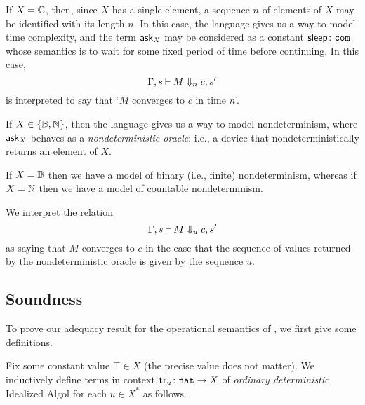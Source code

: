 \documentclass{article}
\begin{document}
\begin{example}
  If $X=\mathbb{C}$, then, since $X$ has a single element, a sequence $n$ of elements of $X$ may be identified with its length $n$.
  In this case, the language \IAX gives us a way to model time complexity, and the term $\operatorname{{\mathsf{ask}}}_X$ may be considered as a constant ${\mathsf{sleep}}\colon {\mathtt{com}}$ whose semantics is to wait for some fixed period of time before continuing.  
  In this case, 
  \[
    \Gamma,s\mathbin{\vdash} M \Downarrow_n c,s'
    \]
  is interpreted to say that `$M$ converges to $c$ in time $n$'.
\end{example}
\begin{example}
  If $X\in\{\mathbb{B},\mathbb{N}\}$, then the language \IAX gives us a way to model nondeterminism, where $\operatorname{{\mathsf{ask}}}_X$ behaves as a \emph{nondeterministic oracle}; i.e., a device that nondeterministically returns an element of $X$.

  If $X=\mathbb{B}$ then we have a model of binary (i.e., finite) nondeterminism, whereas if $X=\mathbb{N}$ then we have a model of countable nondeterminism.

  We interpret the relation
  \[
    \Gamma,s\mathbin{\vdash} M \Downarrow_u c,s'
    \]
  as saying that $M$ converges to $c$ in the case that the sequence of values returned by the nondeterministic oracle is given by the sequence $u$.
\end{example}

\subsection{Soundness}
\label{SecSoundness}

To prove our adequacy result for the operational semantics of \IAX, we first give some definitions.

\begin{definition}
  Fix some constant value $\top \in X$ (the precise value does not matter).
  We inductively define terms in context $\operatorname{tr}_u\colon {\mathtt{nat}} \to X$ of \emph{ordinary deterministic} Idealized Algol for each $u\in X^*$ as follows.
\end{definition}
\end{document}
